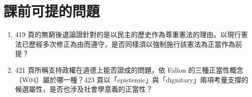 \section{課前可提的問題}
\label{sec:40_paradox-7}

\begin{enumerate}
\tightlist
\item 419 頁的無窮後退論證針對的是以民主的歷史作為尊重憲法的理由。以現行憲法已歷經多次修正為由而遵守，是否同樣須以強制施行該憲法為正當作為前提？
\item 421 頁所稱支持政權在道德上能否證成的問題，依 Fallon 的三種正當性概念（W04）屬於哪一種？423 頁以「epistemic」與「dignitary」兩項考量支撐的候選屬性，是否也涉及社會學意義的正當性？
\end{enumerate}

